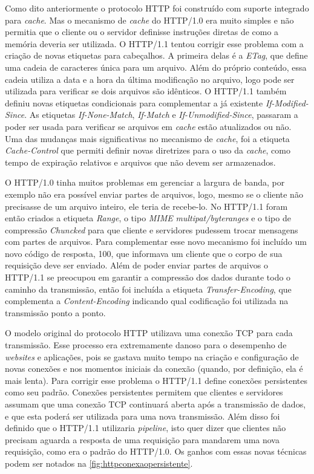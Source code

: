 Como dito anteriormente o protocolo HTTP foi construído com suporte integrado para \textit{cache}. Mas o mecanismo de \textit{cache} do HTTP/1.0 era muito simples e não permitia que o cliente ou o servidor definisse instruções diretas de como a memória deveria ser utilizada. O HTTP/1.1 tentou corrigir esse problema com a criação de novas etiquetas para cabeçalhos. A primeira delas é a \textit{ETag}, que define uma cadeia de caracteres única para um arquivo. Além do próprio conteúdo, essa cadeia utiliza a data e a hora da última modificação no arquivo, logo pode ser utilizada para verificar se dois arquivos são idênticos. O HTTP/1.1 também definiu novas etiquetas condicionais para complementar a já existente \textit{If-Modified-Since}. As etiquetas \textit{If-None-Match}, \textit{If-Match} e \textit{If-Unmodified-Since}, passaram a poder ser usada para verificar se arquivos em \textit{cache} estão atualizados ou não. Uma das mudanças mais significativas no mecanismo de \textit{cache}, foi a etiqueta \textit{Cache-Control} que permiti definir novas diretrizes para o uso da \textit{cache}, como tempo de expiração relativos e arquivos que não devem ser armazenados.

O HTTP/1.0 tinha muitos problemas em gerenciar a largura de banda, por exemplo não era possível enviar partes de arquivos, logo, mesmo se o cliente não precisasse de um arquivo inteiro, ele teria de recebe-lo. No HTTP/1.1 foram então criados a etiqueta \textit{Range}, o tipo \textit{MIME} \textit{multipat/byteranges} e o tipo de compressão \textit{Chuncked} para que cliente e servidores pudessem trocar mensagens com partes de arquivos. Para complementar esse novo mecanismo foi incluído um novo código de resposta, 100, que informava um cliente que o corpo de sua requisição deve ser enviado. Além de poder enviar partes de arquivos o HTTP/1.1 se preocupou em garantir a compressão dos dados durante todo o caminho da transmissão, então foi incluída a etiqueta \textit{Transfer-Encoding}, que complementa a \textit{Content-Encoding} indicando qual codificação foi utilizada na transmissão ponto a ponto.

O modelo original do protocolo HTTP utilizava uma conexão TCP para cada transmissão. Esse processo era extremamente danoso para o desempenho de \textit{websites} e aplicações, pois se gastava muito tempo na criação e configuração de novas conexões e nos momentos iniciais da conexão (quando, por definição, ela é mais lenta). Para corrigir esse problema o HTTP/1.1 define conexões persistentes como seu padrão. Conexões persistentes permitem que clientes e servidores assumam que uma conexão TCP continuará aberta após a transmissão de dados, e que esta poderá ser utilizada para uma nova transmissão. Além disso foi definido que o HTTP/1.1 utilizaria \textit{pipeline}, isto quer dizer que clientes não precisam aguarda a resposta de uma requisição para mandarem uma nova requisição, como era o padrão do HTTP/1.0. Os ganhos com essas novas técnicas podem ser notados na \autoref{fig:httpconexaopersistente}.

